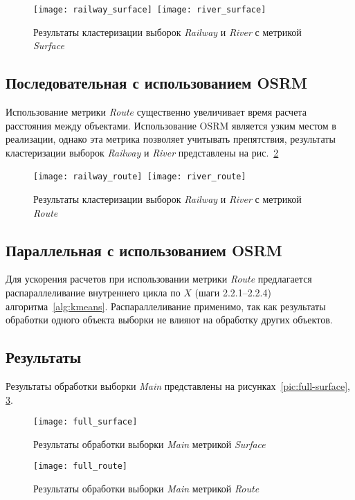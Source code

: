 \begin{figure}[h!]
    \texttt{[image: railway\_surface]}\
    \texttt{[image: river\_surface]} \\[1ex]
    \parbox{.95\textwidth}{\caption{Результаты кластеризации выборок \emph{Railway} и \emph{River} с метрикой \emph{Surface}}\label{pic:test_surface_results}}
    \vspace*{-1ex}
\end{figure}

\subsection{Последовательная с использованием OSRM}
Использование метрики \emph{Route} существенно увеличивает время расчета расстояния между объектами. Использование OSRM является узким местом в реализации, однако эта метрика позволяет учитывать препятствия, результаты кластеризации выборок \emph{Railway} и \emph{River} представлены на рис.~\ref{pic:test_route_results}

\begin{figure}[h!]
    \texttt{[image: railway\_route]}\
    \texttt{[image: river\_route]} \\[1ex]
    \parbox{.95\textwidth}{\caption{Результаты кластеризации выборок \emph{Railway} и \emph{River} с метрикой \emph{Route}}\label{pic:test_route_results}}
    \vspace*{-1ex}
\end{figure}

\subsection{Параллельная с использованием OSRM}
Для ускорения расчетов при использовании метрики \emph{Route} предлагается распараллеливание внутреннего цикла по \( X \) (шаги 2.2.1--2.2.4) алгоритма~\ref{alg:kmeans}. Распараллеливание применимо, так как результаты обработки одного объекта выборки не влияют на обработку других объектов.

\subsection{Результаты} \label{sec:workresults}
Результаты обработки выборки \emph{Main} представлены на рисунках~\ref{pic:full-surface}, \ref{pic:full-route}.

\begin{figure}[h!]
    \centering
    \texttt{[image: full\_surface]}\\[1ex]
    \parbox{.95\textwidth}{\caption{Результаты обработки выборки \emph{Main} метрикой \emph{Surface}}\label{pic:full-surface}}
    \texttt{[image: full\_route]}\\[1ex]
    \parbox{.95\textwidth}{\caption{Результаты обработки выборки \emph{Main} метрикой \emph{Route}}\label{pic:full-route}}
\end{figure}

